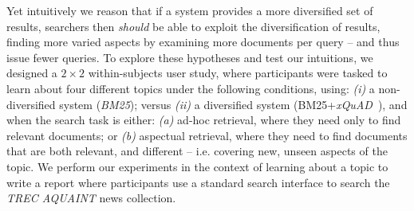 Yet intuitively we reason that if a system provides a more diversified set of results, searchers then \emph{should} be able to exploit the diversification of results, finding more varied aspects by examining more documents per query -- and thus issue fewer queries. To explore these hypotheses and test our intuitions, we designed a $2 \times 2$ within-subjects user study, where participants were tasked to learn about four different topics under the following conditions, using: \emph{(i)} a non-diversified system (\emph{BM25}); versus \emph{(ii)} a diversified system (BM25+\emph{xQuAD}~\cite{santos2010query_reformulations_diversification}), and when the search task is either: \emph{(a)} ad-hoc retrieval, where they need only to find relevant documents; or \emph{(b)} aspectual retrieval, where they need to find documents that are both relevant, and different -- i.e. covering new, unseen aspects of the topic. We perform our experiments in the context of learning about a topic to write a report where participants use a standard search interface to search the \emph{TREC AQUAINT} news collection. 


